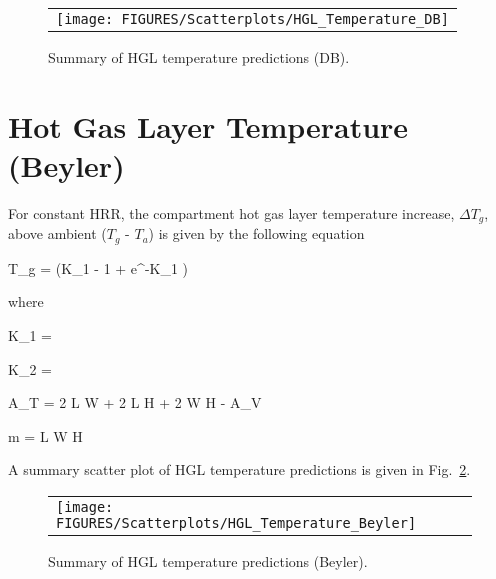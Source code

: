 \begin{figure}[ht]
\begin{center}
\begin{tabular}{l}
\texttt{[image: FIGURES/Scatterplots/HGL\_Temperature\_DB]}
\end{tabular}
\end{center}
\caption[Summary of HGL temperature predictions (DB).]
{Summary of HGL temperature predictions (DB).}
\label{hgl_temperature_DB_summary}
\end{figure}


\clearpage


\section{Hot Gas Layer Temperature (Beyler)}

For constant HRR, the compartment hot gas layer temperature increase, $\Delta T_g$, above ambient ($T_g$ - $T_a$) is given by the following equation

\be
\Delta T_g =  (K_1  - 1 + e^{-K_1 })
\ee

\noindent where

\be
K_1 = 
\ee

\be
K_2 = 
\ee

\be
A_T = 2 L W + 2 L H + 2 W H - A_V
\ee

\be
m = L W H \rho
\ee

\clearpage

A summary scatter plot of HGL temperature predictions is given in Fig.~\ref{hgl_temperature_beyler_summary}. 

\begin{figure}[ht]
\begin{center}
\begin{tabular}{l}
\texttt{[image: FIGURES/Scatterplots/HGL\_Temperature\_Beyler]}
\end{tabular}
\end{center}
\caption[Summary of HGL temperature predictions (Beyler).]
{Summary of HGL temperature predictions (Beyler).}
\label{hgl_temperature_beyler_summary}
\end{figure}

